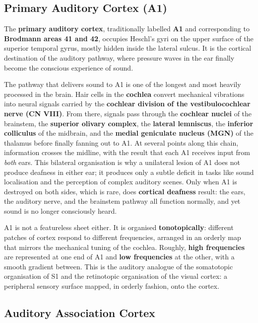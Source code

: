 \documentclass[11pt]{article}
\begin{document}
\subsection{Primary Auditory Cortex (A1)}

The \textbf{primary auditory cortex}, traditionally labelled \textbf{A1} and corresponding to \textbf{Brodmann areas 41 and 42}, occupies Heschl's gyri on the upper surface of the superior temporal gyrus, mostly hidden inside the lateral sulcus. It is the cortical destination of the auditory pathway, where pressure waves in the ear finally become the conscious experience of sound.

The pathway that delivers sound to A1 is one of the longest and most heavily processed in the brain. Hair cells in the \textbf{cochlea} convert mechanical vibrations into neural signals carried by the \textbf{cochlear division of the vestibulocochlear nerve (CN VIII)}. From there, signals pass through the \textbf{cochlear nuclei} of the brainstem, the \textbf{superior olivary complex}, the \textbf{lateral lemniscus}, the \textbf{inferior colliculus} of the midbrain, and the \textbf{medial geniculate nucleus (MGN)} of the thalamus before finally fanning out to A1. At several points along this chain, information crosses the midline, with the result that each A1 receives input from \textit{both} ears. This bilateral organisation is why a unilateral lesion of A1 does not produce deafness in either ear; it produces only a subtle deficit in tasks like sound localisation and the perception of complex auditory scenes. Only when A1 is destroyed on both sides, which is rare, does \textbf{cortical deafness} result: the ears, the auditory nerve, and the brainstem pathway all function normally, and yet sound is no longer consciously heard.

A1 is not a featureless sheet either. It is organised \textbf{tonotopically}: different patches of cortex respond to different frequencies, arranged in an orderly map that mirrors the mechanical tuning of the cochlea. Roughly, \textbf{high frequencies} are represented at one end of A1 and \textbf{low frequencies} at the other, with a smooth gradient between. This is the auditory analogue of the somatotopic organisation of S1 and the retinotopic organisation of the visual cortex: a peripheral sensory surface mapped, in orderly fashion, onto the cortex.

\subsection{Auditory Association Cortex}
\end{document}
